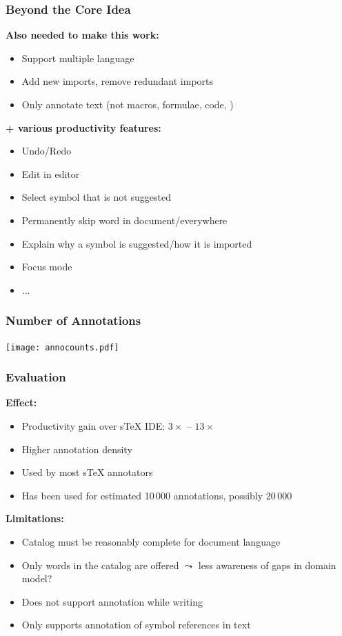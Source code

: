 \documentclass[aspectratio=169]{beamer}
\begin{document}
\begin{frame}
    \frametitle{Beyond the Core Idea}
    \textbf{Also needed to make this work:}
    \begin{itemize}
        \item Support multiple language
        \item Add new imports, remove redundant imports
        \item Only annotate text (not macros, formulae, code, \textellipsis)
    \end{itemize}

    \vspace{1em}
    \textbf{+ various productivity features:}
    \begin{itemize}
        \item Undo/Redo
        \item Edit in editor
        \item Select symbol that is not suggested
        \item Permanently skip word in document/everywhere
        \item Explain why a symbol is suggested/how it is imported
        \item Focus mode
        \item ...
    \end{itemize}
\end{frame}

\begin{frame}
    \frametitle{Number of Annotations}
    \centering
    \texttt{[image: annocounts.pdf]}
\end{frame}


\begin{frame}
    \frametitle{Evaluation}
    \textbf{Effect:}
    \begin{itemize}
        \item Productivity gain over sTeX IDE: $3\times$ -- $13\times$
        \item Higher annotation density
        \item Used by most sTeX annotators
        \item Has been used for estimated 10\,000 annotations, possibly 20\,000
    \end{itemize}

    \vspace{1em}
    \textbf{Limitations:}
    \begin{itemize}
        \item Catalog must be reasonably complete for document language
        \item Only words in the catalog are offered $\leadsto$ less awareness of gaps in domain model?
        \item Does not support annotation while writing
        \item Only supports annotation of symbol references in text
    \end{itemize}
\end{frame}
\end{document}
